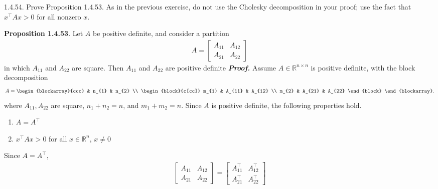 \documentclass{report}
\begin{document}
\begin{remark}
    \pagebreak \bigbreak \noindent 
    \begin{mdframed}
        1.4.54. Prove Proposition 1.4.53. 
        \bigbreak \noindent 
        As in the previous exercise, do not use the Cholesky decomposition in your proof; use the fact that $x^{\top} A x > 0$ for all nonzero $x$.
    \end{mdframed}
    \bigbreak \noindent 
    \textbf{Proposition 1.4.53}. Let $A $ be positive definite, and consider a partition
    \begin{align*}
        A = \begin{bmatrix} A_{11} & A_{12} \\ A_{21} & A_{22} \end{bmatrix}
    \end{align*}
    in which $A_{11} $ and $A_{22} $ are square. Then $A_{11}$ and $A_{22}$ are positive definite
    \bigbreak \noindent 
    \textbf{\textit{Proof.}} Assume $A \in \mathbb{R}^{n\times n}$ is positive definite, with the block decomposition
    \begin{align*}
        A = \begin{blockarray}{ccc}
            & n_{1} & n_{2} \\
            \begin{block}{c[cc]}
                m_{1} & A_{11} & A_{12} \\
                m_{2} & A_{21} & A_{22}
            \end{block}
        \end{blockarray}.
    \end{align*}
    where $A_{11}, A_{22}$ are square, $n_{1} + n_{2} = n$, and $m_{1} + m_{2} = n$. Since $A$ is positive definite, the following properties hold.
    \begin{enumerate}
        \item $A = A^{\top} $
        \item $x^{\top}Ax > 0$ for all $x\in \mathbb{R}^{n}$, $x\ne 0$
    \end{enumerate}
    Since $A = A^{\top}$,
    \begin{align*}
        \begin{bmatrix}
            A_{11} & A_{12} \\
            A_{21} & A_{22}
        \end{bmatrix}
        =
        \begin{bmatrix}
            A_{11}^{\top} & A_{12}^{\top} \\
            A_{21}^{\top} & A_{22}^{\top}
        \end{bmatrix}

\end{align*}
\end{remark}
\end{document}
